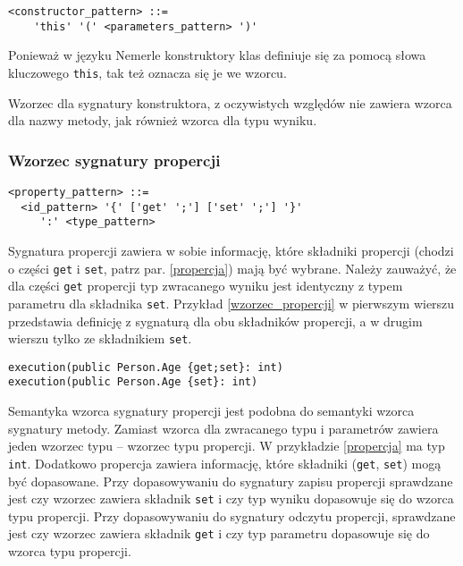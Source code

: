 \documentclass[a4paper,12pt]{mwbk}
\begin{document}
\begin{lstlisting}[style=grammar]
<constructor_pattern> ::=
    'this' '(' <parameters_pattern> ')'
\end{lstlisting}

Ponieważ w języku Nemerle konstruktory klas definiuje się za pomocą słowa
kluczowego \lstinline!this!, tak też oznacza się je we wzorcu.

Wzorzec dla sygnatury konstruktora, z oczywistych względów
nie zawiera wzorca dla nazwy metody, jak również wzorca dla typu wyniku. 

\subsubsection{Wzorzec sygnatury propercji}

\begin{lstlisting}[style=grammar]
<property_pattern> ::=
  <id_pattern> '{' ['get' ';'] ['set' ';'] '}'
     ':' <type_pattern>
\end{lstlisting}

Sygnatura propercji zawiera w sobie
informację, które składniki propercji (chodzi o części \lstinline!get! i
\lstinline!set!, patrz par. \ref{propercja}) mają być wybrane.  Należy zauważyć, że
dla części \lstinline!get! propercji typ zwracanego wyniku jest identyczny z
typem parametru dla składnika \lstinline!set!. Przykład \ref{wzorzec_propercji}
w pierwszym wierszu przedstawia definicję z sygnaturą dla obu składników
propercji, a w drugim wierszu tylko ze składnikiem \lstinline!set!. 

\begin{lstlisting}[style=AspectJ,caption=Wzorzec sygnatury propercji,label=wzorzec_propercji]
execution(public Person.Age {get;set}: int)
execution(public Person.Age {set}: int)
\end{lstlisting}

Semantyka wzorca sygnatury propercji jest podobna do semantyki wzorca sygnatury
metody. Zamiast wzorca dla zwracanego typu i parametrów zawiera jeden wzorzec
typu -- wzorzec typu propercji. W przykładzie \ref{propercja} ma typ \lstinline!int!. Dodatkowo
propercja zawiera informację, które składniki (\lstinline!get!,
\lstinline!set!) mogą być dopasowane. Przy dopasowywaniu do sygnatury zapisu
propercji sprawdzane jest czy wzorzec zawiera składnik \lstinline!set! i czy
typ wyniku dopasowuje się do wzorca typu propercji.  Przy dopasowywaniu do
sygnatury odczytu propercji, sprawdzane jest czy wzorzec zawiera składnik
\lstinline!get!  i czy typ parametru dopasowuje się do wzorca typu propercji.
\end{document}
